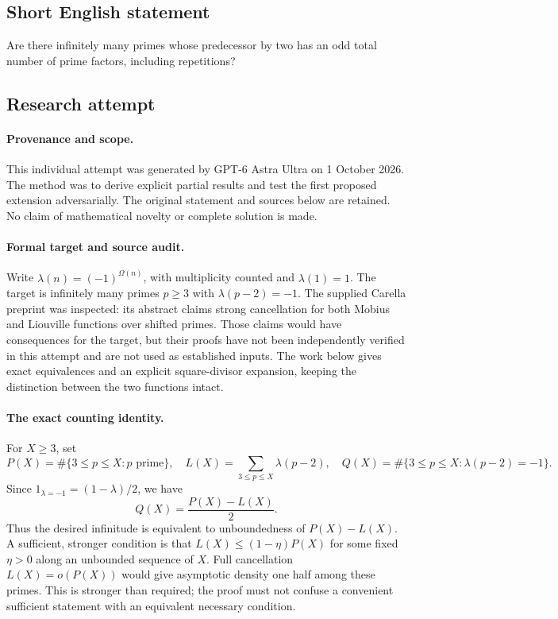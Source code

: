 \documentclass[11pt,a4paper]{article}
\begin{document}
\subsection{Short English statement}

Are there infinitely many primes whose predecessor by two has an odd total number of prime factors, including repetitions?

\subsection{Research attempt}

\paragraph{Provenance and scope.}
This individual attempt was generated by GPT-6 Astra Ultra on 1 October 2026. The method was to derive explicit partial results and test the first proposed extension adversarially. The original statement and sources below are retained. No claim of mathematical novelty or complete solution is made.

\paragraph{Formal target and source audit.}
Write $\lambda(n)=(-1)^{\Omega(n)}$, with multiplicity counted and $\lambda(1)=1$. The target is infinitely many primes $p\geq3$ with $\lambda(p-2)=-1$. The supplied Carella preprint was inspected: its abstract claims strong cancellation for both Mobius and Liouville functions over shifted primes. Those claims would have consequences for the target, but their proofs have not been independently verified in this attempt and are not used as established inputs. The work below gives exact equivalences and an explicit square-divisor expansion, keeping the distinction between the two functions intact.

\paragraph{The exact counting identity.}
For $X\geq3$, set
\[
 P(X)=\#\{3\leq p\leq X:p\text{ prime}\},\quad
 L(X)=\sum_{3\leq p\leq X}\lambda(p-2),\quad
 Q(X)=\#\{3\leq p\leq X:\lambda(p-2)=-1\}.
\]
Since $1_{\lambda=-1}=(1-\lambda)/2$, we have
\[
 Q(X)=\frac{P(X)-L(X)}2.
\]
Thus the desired infinitude is equivalent to unboundedness of $P(X)-L(X)$. A sufficient, stronger condition is that $L(X)\leq(1-\eta)P(X)$ for some fixed $\eta>0$ along an unbounded sequence of $X$. Full cancellation $L(X)=o(P(X))$ would give asymptotic density one half among these primes. This is stronger than required; the proof must not confuse a convenient sufficient statement with an equivalent necessary condition.
\end{document}
